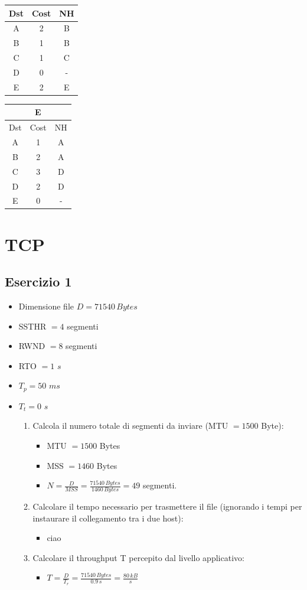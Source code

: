 \documentclass[10pt]{article}
\begin{document}
\begin{table}[h!]
\begin{tabular}{|c||c||c|}
 			Dst & Cost & NH\\
 			\hline
 			A & 2 & B \\
 			B & 1 & B \\
 			C & 1 & C \\
 			D & 0 & - \\
 			E & 2 & E \\
 			\hline
		\end{tabular}
		\begin{tabular}{|c||c||c|}
 			\hline
	 		\multicolumn{3}{|c|}{E} \\
 			\hline
 			Dst & Cost & NH\\
 			\hline
 			A & 1 & A \\
 			B & 2 & A \\
 			C & 3 & D \\
 			D & 2 & D \\
 			E & 0 & - \\
 			\hline
		\end{tabular}
	\end{table}
\newpage
\section{TCP}
	\subsection{Esercizio 1}
	\begin{itemize}
	\item
	Dimensione file $D = 71540 \,Bytes$	
	\item
	SSTHR $= 4$ segmenti
	\item
	RWND $= 8$ segmenti
	\item
	RTO $= 1$ $s$
	\item
	$T_p = 50$ $ms$
	\item
	$T_t = 0$ $s$ 
		\begin{enumerate}
		\item
		Calcola il numero totale di segmenti da inviare (MTU $= 1500$ Byte):
			\begin{itemize}
			\item
			MTU $= 1500$ Bytes
			\item
			MSS $= 1460$ Bytes
			\item
			$N = \displaystyle{\frac{D}{MSS} = \frac{71540 \,Bytes}{1460 \,Bytes} = 49}$ segmenti.
		\end{itemize}
		\item
		Calcolare il tempo necessario per trasmettere il file (ignorando i tempi per instaurare il collegamento tra i due host):
			\begin{itemize}
			\item
			ciao
			\end{itemize}
		\item
		Calcolare il throughput T percepito dal livello applicativo:
			\begin{itemize}
			\item
			$T = \displaystyle{\frac{D}{T_r} = \frac{71540\,Bytes}{0.9\,s} = \frac{80\,kB}{s}}$ 
			\end{itemize}
		\end{enumerate}
	\end{itemize}
\end{document}
